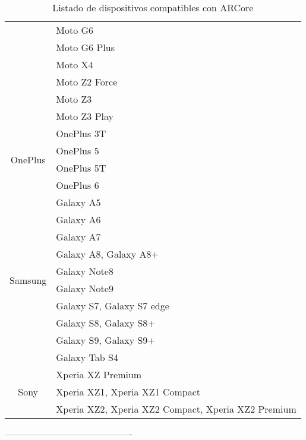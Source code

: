 \begin{table}[]
\begin{tabular}{|c|l|}
		& Moto G6                                            \\ \cline{2-2} 
		& Moto G6 Plus                                       \\ \cline{2-2} 
		& Moto X4                                            \\ \cline{2-2} 
		& Moto Z2 Force                                      \\ \cline{2-2} 
		& Moto Z3                                            \\ \cline{2-2} 
		& Moto Z3 Play                                       \\ \hline
		\multirow{4}{*}{OnePlus}    & OnePlus 3T                                         \\ \cline{2-2} 
		& OnePlus 5                                          \\ \cline{2-2} 
		& OnePlus 5T                                         \\ \cline{2-2} 
		& OnePlus 6                                          \\ \hline
		\multirow{10}{*}{Samsung}   & Galaxy A5                                          \\ \cline{2-2} 
		& Galaxy A6                                          \\ \cline{2-2} 
		& Galaxy A7                                          \\ \cline{2-2} 
		& Galaxy A8, Galaxy A8+                              \\ \cline{2-2} 
		& Galaxy Note8                                       \\ \cline{2-2} 
		& Galaxy Note9                                       \\ \cline{2-2} 
		& Galaxy S7, Galaxy S7 edge                          \\ \cline{2-2} 
		& Galaxy S8, Galaxy S8+                              \\ \cline{2-2} 
		& Galaxy S9, Galaxy S9+                              \\ \cline{2-2} 
		& Galaxy Tab S4                                      \\ \hline
		\multirow{3}{*}{Sony}       & Xperia XZ Premium                                  \\ \cline{2-2} 
		& Xperia XZ1, Xperia XZ1 Compact                     \\ \cline{2-2} 
		& Xperia XZ2, Xperia XZ2 Compact, Xperia XZ2 Premium \\ \hline
	\end{tabular}

\captionsetup{justification=centering}
\caption{Listado de dispositivos compatibles con ARCore}
\end{table}


----------------------------------------------
